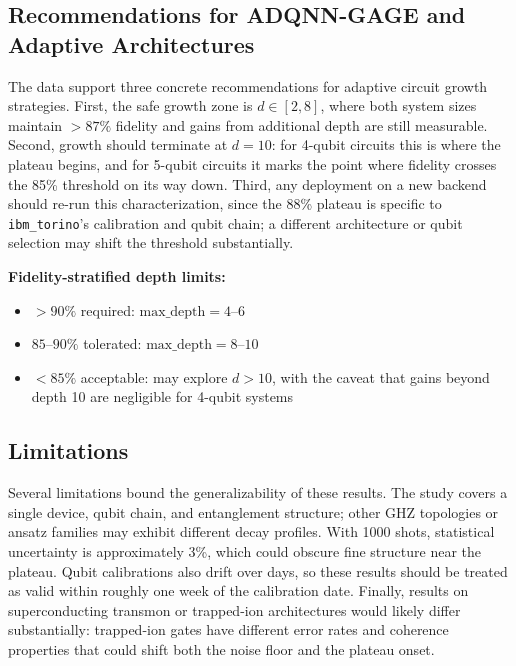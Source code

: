 \documentclass[12pt,letterpaper]{article}
\begin{document}
\subsection{Recommendations for ADQNN-GAGE and Adaptive Architectures}

The data support three concrete recommendations for adaptive circuit growth
strategies. First, the safe growth zone is $d \in [2, 8]$, where both system sizes
maintain $>87\%$ fidelity and gains from additional depth are still measurable.
Second, growth should terminate at $d = 10$: for 4-qubit circuits this is where
the plateau begins, and for 5-qubit circuits it marks the point where fidelity
crosses the 85\% threshold on its way down. Third, any deployment on a new backend
should re-run this characterization, since the 88\% plateau is specific to
\texttt{ibm\_torino}'s calibration and qubit chain; a different architecture or
qubit selection may shift the threshold substantially.

\noindent\textbf{Fidelity-stratified depth limits:}
\begin{itemize}
  \item $>90\%$ required: $\text{max\_depth} = 4$--$6$
  \item $85$--$90\%$ tolerated: $\text{max\_depth} = 8$--$10$
  \item $<85\%$ acceptable: may explore $d > 10$, with the caveat that gains
        beyond depth 10 are negligible for 4-qubit systems
\end{itemize}

\subsection{Limitations}

Several limitations bound the generalizability of these results. The study covers a
single device, qubit chain, and entanglement structure; other GHZ topologies or
ansatz families may exhibit different decay profiles. With 1000 shots, statistical
uncertainty is approximately 3\%, which could obscure fine structure near the
plateau. Qubit calibrations also drift over days, so these results should be treated
as valid within roughly one week of the calibration date. Finally, results on
superconducting transmon or trapped-ion architectures would likely differ
substantially: trapped-ion gates have different error rates and coherence properties
that could shift both the noise floor and the plateau onset.

\end{document}
